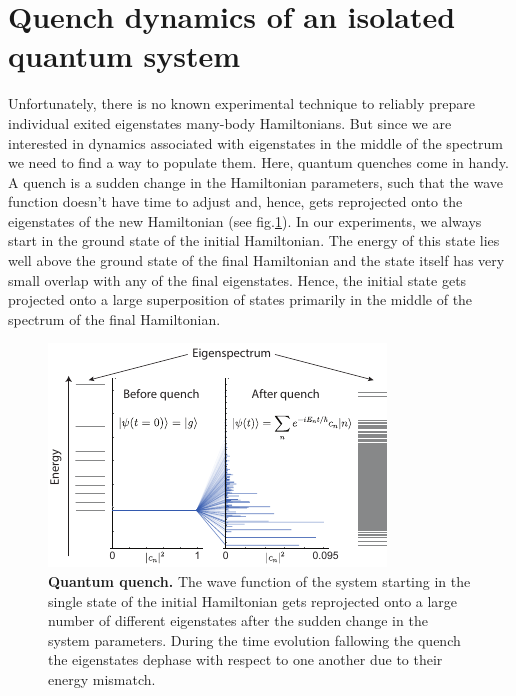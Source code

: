 \section{Quench dynamics of an isolated quantum system}

Unfortunately, there is no known experimental technique to reliably prepare individual exited eigenstates many-body Hamiltonians. But since we are interested in dynamics associated with eigenstates in the middle of the spectrum we need to find a way to populate them. Here, quantum quenches come in handy. A quench is a sudden change in the Hamiltonian parameters, such that the wave function doesn't have time to adjust and, hence, gets reprojected onto the eigenstates of the new Hamiltonian (see fig.\ref{fig:ETH_quench}). In our experiments, we always start in the ground state of the initial Hamiltonian. The energy of this state lies well above the ground state of the final Hamiltonian and the state itself has very small overlap with any of the final eigenstates. Hence, the initial state gets projected onto a large superposition of states primarily in the middle of the spectrum of the final Hamiltonian. 

\begin{figure}[t!]
	\centering
	\includegraphics[scale=1.5]{figures/ETH_quench.pdf}
	\caption{{\bf Quantum quench.} The wave function of the system starting in the single state of the initial Hamiltonian gets reprojected onto a large number of different eigenstates after the sudden change in the system parameters. During the time evolution fallowing the quench the eigenstates dephase with respect to one another due to their energy mismatch. }
	\label{fig:ETH_quench}
\end{figure}

